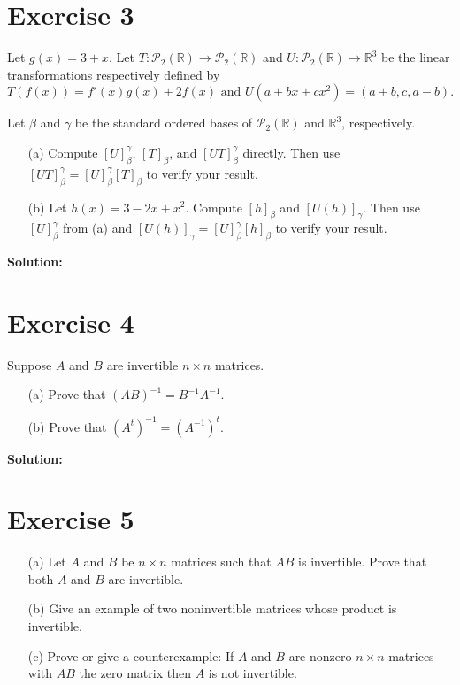 \documentclass{article}
\begin{document}
\section*{Exercise 3}
Let $g(x) = 3 + x$. Let $T : \mathcal{P}_2(\mathbb{R}) \to \mathcal{P}_2(\mathbb{R})$ and $U : \mathcal{P}_2(\mathbb{R}) \to \mathbb{R}^3$ be the linear transformations respectively defined by
$$T(f(x)) = f'(x)g(x) + 2f(x) \text{ and } U(a + bx + cx^2) = (a + b, c, a - b).$$

Let $\beta$ and $\gamma$ be the standard ordered bases of $\mathcal{P}_2(\mathbb{R})$ and $\mathbb{R}^3$, respectively.

\begin{enumerate}
\item[(a)] Compute $[U]_{\beta}^{\gamma}$, $[T]_{\beta}$, and $[UT]_{\beta}^{\gamma}$ directly. Then use $[UT]_{\beta}^{\gamma} = [U]_{\beta}^{\gamma}[T]_{\beta}$ to verify your result.
\item[(b)] Let $h(x) = 3 - 2x + x^2$. Compute $[h]_{\beta}$ and $[U(h)]_{\gamma}$. Then use $[U]_{\beta}^{\gamma}$ from (a) and $[U(h)]_{\gamma} = [U]_{\beta}^{\gamma}[h]_{\beta}$ to verify your result.
\end{enumerate}

\textbf{Solution: } \\



\newpage

\section*{Exercise 4}
Suppose $A$ and $B$ are invertible $n \times n$ matrices.

\begin{enumerate}
\item[(a)] Prove that $(AB)^{-1} = B^{-1}A^{-1}$.
\item[(b)] Prove that $(A^t)^{-1} = (A^{-1})^t$.
\end{enumerate}

\textbf{Solution: } \\



\newpage

\section*{Exercise 5}
\begin{enumerate}
\item[(a)] Let $A$ and $B$ be $n \times n$ matrices such that $AB$ is invertible. Prove that both $A$ and $B$ are invertible.
\item[(b)] Give an example of two noninvertible matrices whose product is invertible.
\item[(c)] Prove or give a counterexample: If $A$ and $B$ are nonzero $n \times n$ matrices with $AB$ the zero matrix then $A$ is not invertible.
\end{enumerate}
\end{document}
